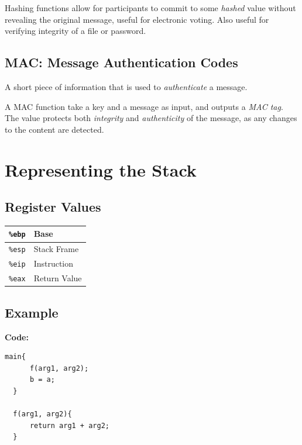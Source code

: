 \documentclass{article}
\begin{document}
Hashing functions allow for participants to commit to some \textit{hashed} value without revealing the original message, useful for electronic voting. Also useful for verifying integrity of a file or password.

\subsection{MAC: Message Authentication Codes}

A short piece of information that is used to \textit{authenticate} a message.

A MAC function take a key and a message as input, and outputs a \textit{MAC tag}. The value protects both \textit{integrity} and \textit{authenticity} of the message, as any changes to the content are detected.

\begin{appendix}

\end{appendix}

\section{Representing the Stack}

\subsection{Register Values}

\begin{tabular}{|c|l|}
  \hline
  \texttt{\%ebp} & Base\\
  \hline
  \texttt{\%esp} & Stack Frame\\
  \hline
  \texttt{\%eip} & Instruction\\
  \hline
  \texttt{\%eax} & Return Value\\
  \hline
\end{tabular}

\subsection{Example}

\textbf{Code:}
\begin{lstlisting}[basicstyle=\ttfamily]
  main{
      f(arg1, arg2);
      b = a;
  }

  f(arg1, arg2){
      return arg1 + arg2;
  }
\end{lstlisting}
\end{document}
